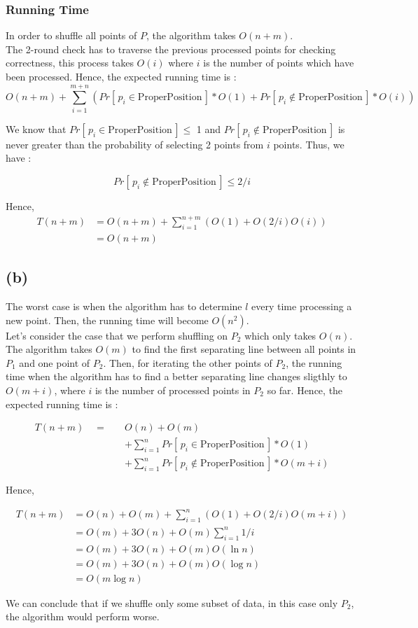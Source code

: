 \subsubsection*{Running Time}
In order to shuffle all points of $P$, the algorithm takes $O(n+m)$.\\

The 2-round check has to traverse the previous processed points for checking correctness, this process takes $O(i)$ where $i$ is the number of points which have been processed. Hence, the expected running time is :
$$
O(n+m) + \sum_{i=1}^{m+n}{ ( Pr[\,p_i \in \text{ProperPosition}\,]*O(1)
    + Pr[\,p_i \not\in \text{ProperPosition}\,]*O(i)
) }
$$

We know that $Pr[\,p_i \in \text{ProperPosition}\,] \le$ 1 and $Pr[\,p_i \not\in \text{ProperPosition}\,]$
is never greater than the probability of selecting 2 points from $i$ points. Thus,
we have :

$$
Pr[\,p_i \not\in \text{ProperPosition}\,] \le 2/i
$$

Hence,
\begin{align*}
T(n+m) &= O(n+m) + \sum_{i=1}^{n+m}( O(1) + O(2/i)O(i) ) \\
&= O(n+m)
\end{align*}

\subsection*{(b)}
The worst case is when the algorithm has to determine $l$ every time processing a
new point. Then, the running time will become $O(n^2)$. \\

Let's consider the case that we perform shuffling on $P_2$ which only takes $O(n)$.
The algorithm takes $O(m)$ to find the first separating line between all points in $P_1$
and one point of $P_2$. Then, for iterating the other points of $P_2$, the running
time when the algorithm has to find a better separating line changes sligthly to
$O(m+i)$, where $i$ is the number of processed points in $P_2$ so far. Hence, the expected running time is :

\begin{align*}
T(n+m) \quad =\quad & O(n) + O(m) \\
        &+ \sum_{i=1}^{n}{ Pr[\,p_i \in \text{ProperPosition}\,]*O(1) } \\
        &+ \sum_{i=1}^{n}{ Pr[\,p_i \not\in \text{ProperPosition}\,]*O(m+i) }
\end{align*}

Hence,

\begin{align*}
T(n+m) &= O(n) + O(m) + \sum_{i=1}^{n}(O(1) + O(2/i)O(m+i)) \\
&= O(m) + 3O(n) + O(m)\sum_{i=1}^{n}1/i \\
&= O(m) + 3O(n) + O(m)O(\ln{n}) \\
&= O(m) + 3O(n) + O(m)O(\log{n}) \\
&= O(m\log{n})
\end{align*}

We can conclude that if we shuffle only some subset of data, in this case only $P_2$,
the algorithm would perform worse.
